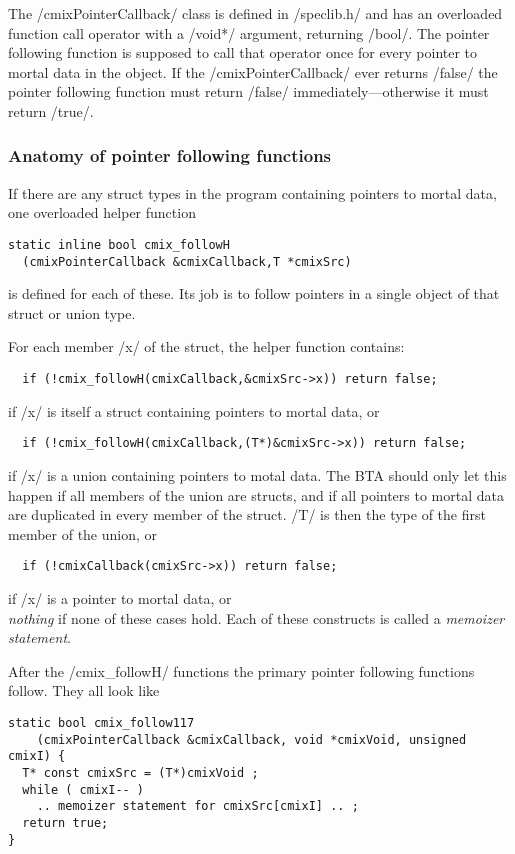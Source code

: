 \begin{docpart}
The /cmixPointerCallback/ class is defined in /speclib.h/ and
has an overloaded function call operator with a /void*/ argument,
returning /bool/. The
pointer following function is supposed to call that operator once
for every pointer to mortal data in the object. If the
/cmixPointerCallback/ ever returns /false/ the pointer following
function must return /false/ immediately---otherwise it must
return /true/.

\subsubsection{Anatomy of pointer following functions}
If there are any struct types in the program containing pointers to
mortal data, one overloaded helper function
\begin{verbatim}
static inline bool cmix_followH
  (cmixPointerCallback &cmixCallback,T *cmixSrc)
\end{verbatim}
is defined for each of these. Its job is to follow pointers in a
single object of that struct or union type.

For each member /x/ of the struct, the helper function contains:
\begin{verbatim}
  if (!cmix_followH(cmixCallback,&cmixSrc->x)) return false;
\end{verbatim}
\noindent if /x/ is itself a struct containing pointers to mortal
data, or
\begin{verbatim}
  if (!cmix_followH(cmixCallback,(T*)&cmixSrc->x)) return false;
\end{verbatim}
\noindent if /x/ is a union containing pointers to motal data. The
BTA should only let this happen if all members of the union are
structs, and if all pointers to mortal data are duplicated in every
member of the struct. /T/ is then the type of the first member of
the union, or
\begin{verbatim}
  if (!cmixCallback(cmixSrc->x)) return false;
\end{verbatim}
\noindent if /x/ is a pointer to mortal data, or \\
\emph{nothing} if none of these cases hold. Each of these
constructs is called a \emph{memoizer statement}.

After the /cmix_followH/ functions the primary pointer following
functions follow. They all look like
\begin{verbatim}
static bool cmix_follow117
    (cmixPointerCallback &cmixCallback, void *cmixVoid, unsigned cmixI) {
  T* const cmixSrc = (T*)cmixVoid ;
  while ( cmixI-- )
    .. memoizer statement for cmixSrc[cmixI] .. ;
  return true;
}
\end{verbatim}


\end{docpart}
